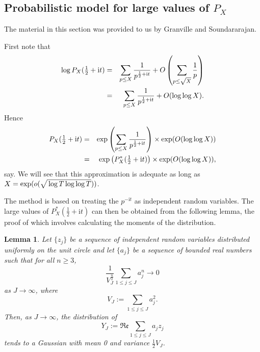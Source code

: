 \documentclass[10pt,reqno,twoside]{amsart}
\renewcommand{\i}{{\mathrm{i}}} %
\renewcommand{\Re}{{\mathfrak{Re}}}
\newtheorem{lemma}[theorem]{Lemma}
\numberwithin{equation}{section}
\numberwithin{theorem}{section}
\begin{document}
{{%

\subsection{Probabilistic model  for large values of $P_X$}\label{sect:prime model}

The material in this section was provided to us by Granville and Soundararajan.

First note that
\begin{eqnarray}
\log P_X(\tfrac12+\i t)
&=&\sum_{p\le X} \frac{1}{p^{\frac12+\i t}}
    + O\left(\sum_{p\le \sqrt{\mathstrut X}} \frac{1}{p}\right) \cr
&=&\sum_{p\le X} \frac{1}{p^{\frac12+\i t}} + O(\log\log X).
\end{eqnarray}
Hence
\begin{eqnarray}\label{eqn:Pstar}
P_X(\tfrac12+\i t) &=& \exp\left(\sum_{p\le X} \frac{1}{p^{\frac12+\i t}} \right)
    \times \exp(O(\log\log X)) \cr
&=& \exp\left(P^*_X(\tfrac12+\i t) \right)
        \times \exp(O(\log\log X)) ,
\end{eqnarray}
say.
We will see that this approximation is adequate as long as
$X=\exp(o(\sqrt{\mathstrut \log T\log\log T}))$.

The method is based  on treating the $p^{-\i t}$ as independent random
variables.  The large values of $P^*_X(\tfrac12+\i t)$ can then be
obtained from the following lemma, the proof of which involves
calculating the moments of the distribution.
\begin{lemma}  Let $\{z_j\}$ be a sequence of independent random variables distributed
uniformly on the unit circle and let $\{a_j\}$ be a sequence of bounded
real numbers such that for all $n \ge 3$,
\begin{equation}
\frac{1}{V_J^{\frac{n}{2}}} \sum_{1\le j\le J} a_j^n\to 0
\end{equation}
as $J\to\infty$, where
\begin{equation}
V_J:= \sum_{1\le j\le J} a_j^2 .
\end{equation}
Then, as $J\to\infty$, the distribution of
\begin{equation}
Y_J:= \Re \sum_{1\le j\le J} a_j z_j
\end{equation}
tends to a Gaussian with mean 0 and variance $\frac12 V_J$.
\end{lemma}


}}
\end{document}
